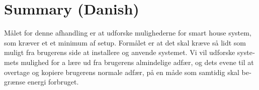\chapter{Summary (Danish)}
\begin{otherlanguage}{danish}

Målet for denne afhandling er at udforske mulighederne for smart house system, som kræver et et minimum af setup. Formålet er at det skal kræve så lidt som muligt fra brugerens side at installere og anvende systemet. Vi vil udforske systemets mulighed for a lære ud fra brugerens almindelige adfær, og dets evene til at overtage og kopiere brugerens normale adfær, på en måde som samtidig skal begrænse energi forbruget.

\end{otherlanguage}
